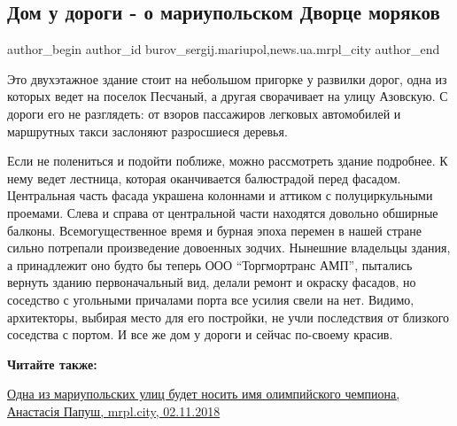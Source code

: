  
 
 
 
 
 
\subsection{Дом у дороги - о мариупольском Дворце моряков}
\label{sec:03_11_2018.stz.news.ua.mrpl_city.1.dom_u_dorogi_o_mariupol_dvorce_morjakov}
 
\ifcmt
 author_begin
   author_id burov_sergij.mariupol,news.ua.mrpl_city
 author_end
\fi

Это двухэтажное здание стоит на небольшом пригорке у развилки дорог, одна из
которых ведет на поселок Песчаный, а другая сворачивает на улицу Азовскую. С
дороги его не разглядеть: от взоров пассажиров легковых автомобилей и
маршрутных такси заслоняют разросшиеся деревья.


Если не полениться и подойти поближе, можно рассмотреть здание подробнее. К
нему ведет лестница, которая оканчивается балюстрадой перед фасадом.
Центральная часть фасада украшена колоннами и аттиком с полуциркульными
проемами. Слева и справа от центральной части находятся довольно обширные
балконы. Всемогущественное время и бурная эпоха перемен в нашей стране сильно
потрепали произведение довоенных зодчих. Нынешние владельцы здания, а
принадлежит оно будто бы теперь ООО \enquote{Торгмортранс АМП}, пытались вернуть зданию
первоначальный вид, делали ремонт и окраску фасадов, но соседство с угольными
причалами порта все усилия свели на нет. Видимо, архитекторы, выбирая место для
его постройки, не учли последствия от близкого соседства с портом. И все же дом
у дороги и сейчас по-своему красив.

\textbf{Читайте также:} 

\href{https://mrpl.city/news/view/odna-iz-mariupolskih-ulits-budet-nosit-imya-olimpijskogo-chempiona}{Одна из мариупольских улиц будет носить имя олимпийского чемпиона, Анастасія Папуш, mrpl.city, 02.11.2018}

